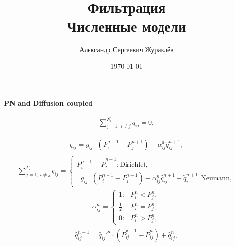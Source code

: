 \documentclass[a4paper,12pt,russian]{extreport}
\author{Александр Сергеевич Журавлёв}
\title{Фильтрация\\Численные модели}
\date{\today}
\begin{document}
    \pagecolor{pageColor}
    \color{fontColor}
    \Russian
    \printnomenclature[5em]


    \begin{center}
    {\large \textbf{PN and Diffusion coupled}}
    \end{center}

    \begin{eqnarray}
        \begin{gathered}
            \sum^{N_{i}}_{j=1, \; i\neq j} q_{ij} = 0,   \\
        \end{gathered}
    \end{eqnarray}
    \begin{eqnarray}
        \begin{gathered}
            q_{ij} = g_{ij} \cdot \left(P^{n+1}_{i} - P^{n+1}_{j}\right) - \alpha^n_{ij} \hat{q}^{n+1}_{ij} ,
        \end{gathered}
    \end{eqnarray}
    \begin{eqnarray}
        \sum^{\Gamma_{i}}_{j=1, \; i\neq j} q_{ij}=\begin{cases}
                                                       P^{n+1}_{i} - \tilde{P}^{n+1}_{i}: \text{Dirichlet},\\
                                                       \; \; g_{ij} \cdot \left(P^{n+1}_{i} - P^{n+1}_{j}\right) - \alpha^n_{ij} \hat{q}^{n+1}_{ij} - \tilde{q}^{n+1}_{i}: \text{Neumann},
        \end{cases}
    \end{eqnarray}
    \begin{eqnarray}
        \alpha^n_{ij} =\begin{cases}
                           1: & P^{n}_{i} < P^{n}_{j},\\
                           \frac{1}{2} : & P^{n}_{i} = P^{n}_{j},\\
                           0: & P^{n}_{i} > P^{n}_{j},
        \end{cases}
    \end{eqnarray}
    \begin{eqnarray}
        \begin{gathered}
            \hat{q}_{ij}^{n+1} = \hat{q}_{ij}'^n \cdot \left(\bar{P}_{ij}^{n+1}-\bar{P}_{ij}^n\right)+\hat{q}_{ij}^n,
        \end{gathered}
    \end{eqnarray}
\end{document}
